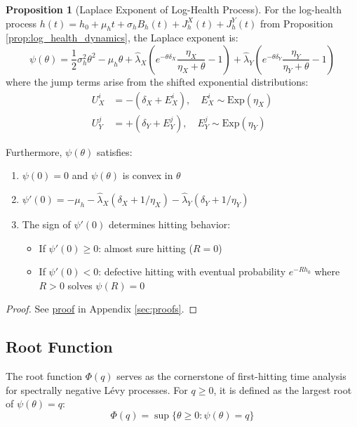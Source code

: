 \documentclass{article}
\theoremstyle{definition}
\newtheorem{proposition}{Proposition}[section]
\newcommand{\proofref}[1]{\hyperlink{#1}{proof}}
\begin{document}
\begin{proposition}[Laplace Exponent of Log-Health Process]
\label{prop:laplace_exponent}
For the log-health process $h(t) = h_0 + \mu_h t + \sigma_h B_h(t) + J_h^X(t) + J_h^Y(t)$ from Proposition \ref{prop:log_health_dynamics}, the Laplace exponent is:
\begin{equation}
\psi(\theta) = \frac{1}{2}\sigma_h^2 \theta^2 - \mu_h \theta + \hat\lambda_X \left( e^{-\theta \delta_X} \frac{\eta_X}{\eta_X+\theta} - 1 \right) + \hat\lambda_Y \left( e^{-\theta \delta_Y} \frac{\eta_Y}{\eta_Y+\theta} - 1 \right) \label{eq:laplace_exponent_sec3}
\end{equation}
where the jump terms arise from the shifted exponential distributions:
\begin{align}
U_X^i &= -(\delta_X + E_X^i), \quad E_X^i \sim \mathrm{Exp}(\eta_X)\\
U_Y^j &= +(\delta_Y + E_Y^j), \quad E_Y^j \sim \mathrm{Exp}(\eta_Y)
\end{align}

Furthermore, $\psi(\theta)$ satisfies:
\begin{enumerate}
    \item $\psi(0) = 0$ and $\psi(\theta)$ is convex in $\theta$
    \item $\psi'(0) = -\mu_h - \hat\lambda_X(\delta_X + 1/\eta_X) - \hat\lambda_Y(\delta_Y + 1/\eta_Y)$
    \item The sign of $\psi'(0)$ determines hitting behavior:
    \begin{itemize}
        \item If $\psi'(0) \geq 0$: almost sure hitting ($R = 0$)
        \item If $\psi'(0) < 0$: defective hitting with eventual probability $e^{-Rh_0}$ where $R > 0$ solves $\psi(R) = 0$
    \end{itemize}
\end{enumerate}
\end{proposition}

\begin{proof}
See \proofref{prop:laplace_exponent} in Appendix \ref{sec:proofs}.
\end{proof}

\subsection{Root Function}

The root function $\Phi(q)$ serves as the cornerstone of first-hitting time analysis for spectrally negative Lévy processes. For $q \geq 0$, it is defined as the largest root of $\psi(\theta) = q$:
\begin{equation}
\Phi(q) = \sup\{\theta \geq 0 : \psi(\theta) = q\} \label{eq:root_function_sec3}
\end{equation}
\end{document}
